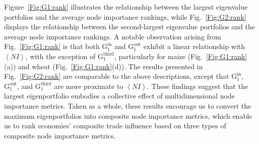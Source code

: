 \documentclass[preprint,3p,times,sort&compress]{elsarticle}
\begin{document}
Figure~\ref{Fig:G1:rank} illustrates the relationship between the largest eigenvalue portfolios and the average node importance rankings, while Fig.~\ref{Fig:G2:rank} displays the relationship between the second-largest eigenvalue portfolios and the average node importance rankings. A notable observation arising from Fig.~\ref{Fig:G1:rank} is that both $\mathrm{G}^{\mathrm{in}}_1$ and $\mathrm{G}^{\mathrm{out}}_1$ exhibit a linear relationship with $\left \langle {NI}\right \rangle$, with the exception of $\mathrm{G}^{\mathrm{third}}_1$, particularly for maize (Fig.~\ref{Fig:G1:rank}(a)) and wheat (Fig.~\ref{Fig:G1:rank}(d)). The results presented in Fig.~\ref{Fig:G2:rank} are comparable to the above descriptions, except that $\mathrm{G}^{\mathrm{in}}_1$, $\mathrm{G}^{\mathrm{out}}_1$, and $\mathrm{G}^{\mathrm{third}}_1$ are more proximate to $\left\langle { NI}\right \rangle$. These findings suggest that the largest eigenportfolio embodies a collective effect of multidimensional node importance metrics. Taken as a whole, these results encourage us to convert the maximum eigenportfolios into composite node importance metrics, which enable us to rank economies' composite trade influence based on three types of composite node importance metrics.
\end{document}
